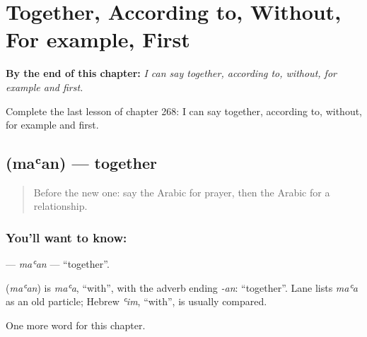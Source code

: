 
\chapter{Together, According to, Without, For example, First}
\label{ch:ar-together-according-to-without-for-example-first}

\begin{chapteropening}
\textbf{By the end of this chapter:} \emph{I can say together, according to, without, for example and first.}

Complete the last lesson of chapter 268: I can say together, according to, without, for example and first.
\end{chapteropening}

\section[\texorpdfstring{\ar{معا} (maʿan)}{معا (maʿan)}]{ (maʿan) — together}

\label{lesson:AR-C268-maan}



\begin{quote}
Before the new one: say the Arabic for prayer, then the Arabic for a relationship.
\end{quote}

\subsection*{You'll want to know: }
\textbf{} — \emph{maʿan} — \textquotedblleft{}together\textquotedblright{}.

\begin{cousinweb}
\textbf{} (\emph{maʿan}) is \emph{maʿa}, \textquotedblleft{}with\textquotedblright{}, with the adverb ending \emph{-an}: \textquotedblleft{}together\textquotedblright{}. Lane lists \emph{maʿa} as an old particle; Hebrew \emph{ʿim}, \textquotedblleft{}with\textquotedblright{}, is usually compared.
\end{cousinweb}

\begin{grammarlens}[title={What you've built}]
One more word for this chapter.
\end{grammarlens}

